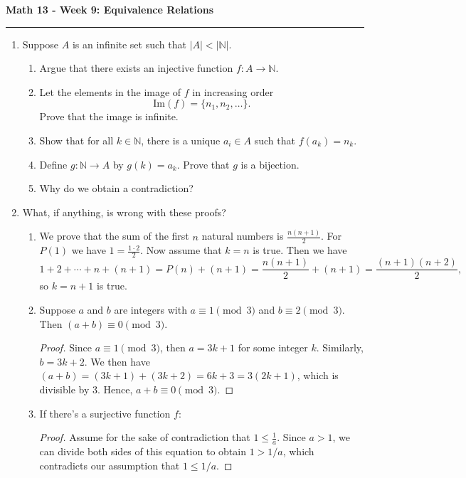 \documentclass[12pt]{report}
\theoremstyle{definition}
\newcommand{\naturals}{\mathbb{N}}
\begin{document}
\begin{center}
{\bf \Large Math 13 - Week 9: Equivalence Relations}
\vspace{0.2cm}
\hrule
\end{center}

\begin{enumerate}

\item Suppose $A$ is an infinite set such that $|A| < |\naturals|$.
\begin{enumerate}
	\item Argue that there exists an injective function $f: A\to \naturals$.
	\vfill

	\item Let the elements in the image of $f$ in increasing order
	\[
	\text{Im}(f) = \{n_1, n_2, \ldots\}.
	\]
	Prove that the image is infinite.

	\vfill

	\item Show that for all $k\in \naturals$, there is a unique $a_i\in A$ such that $f(a_k) = n_k$.

	\vfill

	\item Define $g: \naturals \to A$ by $g(k) = a_k$. Prove that $g$ is a bijection.

	\vfill

	\item Why do we obtain a contradiction?
\end{enumerate}

\vfill

\item What, if anything, is wrong with these proofs?
\begin{enumerate}
	\item We prove that the sum of the first $n$ natural numbers is $\frac{n(n+1)}{2}$. For $P(1)$ we have $1 = \frac{1\cdot 2}{2}$.
	Now assume that $k=n$ is true.
	Then we have
	\[
		1 + 2 + \cdots + n + (n+1) = P(n) + (n+1) = \frac{n(n+1)}{2} + (n+1) = \frac{(n+1)(n+2)}{2},
	\]
	so $k=n+1$ is true.

	\vfill

	\item Suppose $a$ and $b$ are integers with $a\equiv 1\pmod 3$ and $b\equiv 2\pmod 3$. Then $(a+b)\equiv 0\pmod 3$.
	\begin{proof}
		Since $a\equiv 1\pmod 3$, then $a = 3k+1$ for some integer $k$. Similarly, $b = 3k+2$. We then have $(a+b) = (3k+1) + (3k+2) = 6k+3 = 3(2k+1)$, which is divisible  by 3. Hence, $a+b\equiv 0\pmod 3$.
	\end{proof}
	\vfill

	\item If there's a surjective function $f:$
	\begin{proof}
		Assume for the sake of contradiction that $1\leq \frac{1}{a}$. Since $a>1$, we can divide both sides of this equation to obtain $1 > 1/a$, which contradicts our assumption that $1\leq 1/a$.
	\end{proof}
	\vfill
\end{enumerate}
\end{enumerate}
\end{document}
